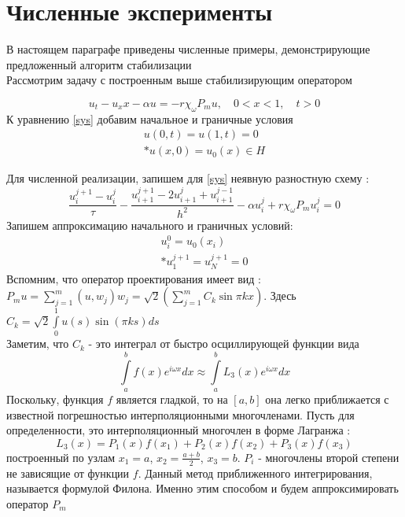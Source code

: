 \section{Численные эксперименты}
\vspace{1em}
В настоящем параграфе приведены численные примеры, демонстрирующие предложенный алгоритм стабилизации\\

Рассмотрим задачу с построенным выше стабилизирующим оператором

\begin{equation}\label{sys}
u_t - u_xx - \alpha u = -r\chi_{\omega}P_m u, \quad 0 < x < 1, \quad t > 0
\end{equation}
К уравнению \eqref{sys} добавим начальное и граничные условия
\begin{gather}\label{s_control}
u(0, t) = u(1, t) = 0 \\*
u(x, 0) = u_{0}(x) \in H \nonumber
\end{gather}

Для численной реализации, запишем для \eqref{sys} неявную разностную схему :\\
\begin{equation}\label{scheme}
	\frac{u^{j + 1}_i - u^j_i}{\tau} - \frac{u_{i + 1}^{j + 1} - 2u_{i + 1}^{j} + u_{i + 1}^{j - 1}}{h^2} - \alpha u^j_i + r\chi_{\omega}P_m u^j_i = 0
\end{equation}
Запишем аппроксимацию начального и граничных условий:\\
\begin{gather}
u_i^0 = u_0(x_i) \\*
u_1^{j+1} = u_N^{j+1} = 0 \nonumber
\end{gather}
Вспомним, что оператор проектирования имеет вид :\\
$P_m u = \sum \limits_{j=1}^{m} {(u, w_j) w_j} = \sqrt{2} (\sum \limits_{j=1}^{m} {C_k \sin{\pi k x}})$. Здесь $C_k = \sqrt{2} \int\limits_0^1{u(s)\sin{(\pi k s)} ds}$\\
Заметим, что $C_k$ - это интеграл от быстро осциллирующей функции вида
\begin{equation}
	\int\limits_a^b{f(x) e^{i\omega x} dx} \approx \int\limits_a^b{L_3(x) e^{i\omega x} dx}
\end{equation}
Поскольку, функция $f$ является гладкой, то на $[a, b]$ она легко приближается с известной погрешностью интерполяционными многочленами. Пусть для определенности, это интерполяционный многочлен в форме Лагранжа :
\begin{equation}
	L_3(x) = P_1(x)f(x_1) + P_2(x)f(x_2) + P_3(x)f(x_3)
\end{equation}
построенный по узлам $x_1 = a$, $x_2 = \frac{a + b}{2}$, $x_3 = b$. $P_i$ - многочлены второй степени не зависящие от функции $f$. Данный метод приближенного интегрирования, называется формулой Филона. Именно этим способом и будем аппроксимировать оператор $P_m$\\

